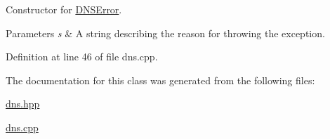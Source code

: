 \-Constructor for \hyperlink{classLibWheel_1_1DNSError}{\-D\-N\-S\-Error}. 


\begin{DoxyParams}{\-Parameters}
{\em s} & \-A string describing the reason for throwing the exception. \\
\hline
\end{DoxyParams}


\-Definition at line 46 of file dns.\-cpp.



\-The documentation for this class was generated from the following files\-:\begin{DoxyCompactItemize}
\item 
\hyperlink{dns_8hpp}{dns.\-hpp}\item 
\hyperlink{dns_8cpp}{dns.\-cpp}\end{DoxyCompactItemize}
